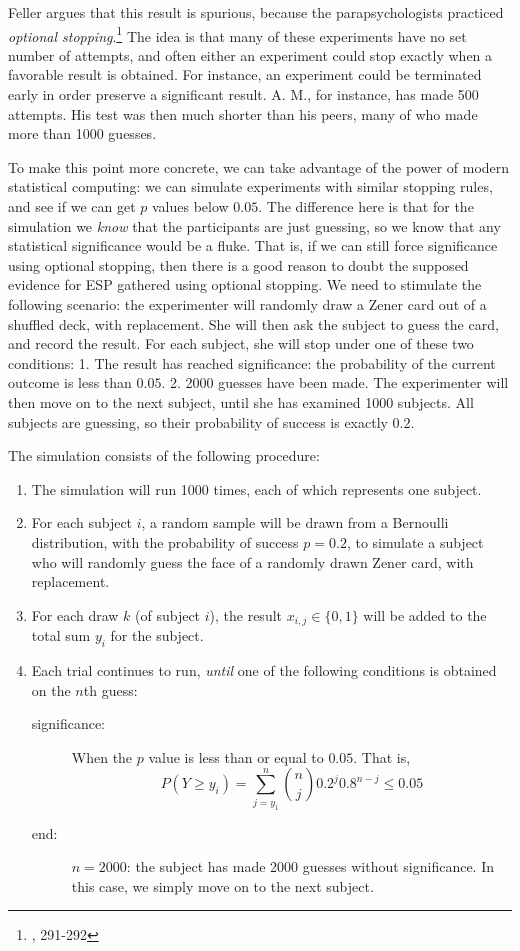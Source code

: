 Feller argues that this result is spurious, because the
parapsychologists practiced \emph{optional stopping}.\footnote{\cite{felleresp}, 291-292} The idea is that
many of these experiments have no set number of attempts, and often
either an experiment could stop exactly when a favorable result is
obtained. For instance, an experiment could be terminated early in order
preserve a significant result. A. M., for instance, has made 500
attempts. His test was then much shorter than his peers, many of who
made more than 1000 guesses.

To make this point more concrete, we can take advantage of the power of modern
statistical computing: we can simulate experiments with similar stopping
rules, and see if we can get $p$ values below $0.05$. The difference here is that for the simulation we \emph{know}
that the participants are just guessing, so we know that any statistical significance would be a fluke. That is, if we can still force
significance using optional stopping, then there is a good reason to
doubt the supposed evidence for ESP gathered using optional stopping. We need to stimulate the following scenario: the experimenter will randomly draw a Zener card out of a shuffled deck, with replacement.
She will then ask the subject to guess the card, and record the result.
For each subject, she will stop under one of these two conditions: 1.
The result has reached significance: the probability of the current
outcome is less than \(0.05\). 2. 2000 guesses have been made. The
experimenter will then move on to the next subject, until she has
examined 1000 subjects. All subjects are guessing, so their probability
of success is exactly \(0.2\).

The simulation consists of the following procedure: 
\begin{enumerate}
	\item The simulation will run 1000 times, each of which represents one subject. 
	\item For each subject $i$, a random sample will be drawn from a Bernoulli distribution, with the probability of success $p=0.2$, to simulate a subject who will randomly guess the face of a randomly drawn Zener card, with replacement. 
	\item For each draw $k$ (of subject $i$), the result $x_{i,j}\in \{0,1\}$ will be added to the total sum $y_i$ for the subject.
	\item Each trial continues to run, \emph{until} one of the following conditions is obtained on the $n$th guess:\begin{description}
		\item[significance:] When the $p$ value is less than or equal to $0.05$. That is, 
		$$P(Y\geq y_i) = \sum_{j=y_1}^n {n \choose j} 0.2^j 0.8^{n-j}\leq 0.05$$
		\item[end:] $n=2000$: the subject has made 2000 guesses without significance. In this case, we simply move on to the next subject.
	\end{description} 
\end{enumerate}

